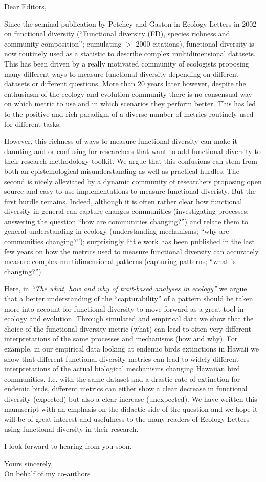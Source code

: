 \documentclass[11pt]{letter}
\begin{document}
\begin{letter}{}
\opening{Dear Editors,}

Since the seminal publication by Petchey and Gaston in Ecology Letters in 2002 on functional diversity (``Functional diversity (FD), species richness and community composition''; cumulating $>$ 2000 citations), functional diversity is now routinely used as a statistic to describe complex multidimensional datasets.
This has been driven by a really motivated community of ecologists proposing many different ways to measure functional diversity depending on different datasets or different questions.
More than 20 years later however, despite the enthusiasm of the ecology and evolution community there is no consensual way on which metric to use and in which scenarios they perform better.
This has led to the positive and rich paradigm of a diverse number of metrics routinely used for different tasks.

However, this richness of ways to measure functional diversity can make it daunting and or confusing for researchers that want to add functional diversity to their research methodology toolkit.
We argue that this confusions can stem from both an epistemological misunderstanding as well as practical hurdles.
The second is nicely alleviated by a dynamic community of researchers proposing open source and easy to use implementations to measure functional diveristy.
But the first hurdle remains.
Indeed, although it is often rather clear how functional diversity in general can capture changes communities (investigating processes; answering the question ``how are communities changing?'') and relate them to general understanding in ecology (understanding mechanisms; ``why are communities changing?''); surprisingly little work has been published in the last few years on how the metrics used to measure functional diversity can accurately measure complex multidimensional patterns (capturing patterns; ``what is changing?'').

Here, in \textit{``The what, how and why of trait-based analyses in ecology''} we argue that a better understanding of the ``capturability'' of a pattern should be taken more into account for functional diversity to move forward as a great tool in ecology and evolution.
Through simulated and empirical data we show that the choice of the functional diversity metric (what) can lead to often very different interpretations of the same processes and mechanisms (how and why).
For example, in our empirical data looking at endemic birds extinctions in Hawaii we show that different functional diversity metrics can lead to widely different interpretations of the actual biological mechanisms changing Hawaiian bird communities.
I.e. with the same dataset and a drastic rate of extinction for endemic birds, different metrics can either show a clear decrease in functional diversity (expected) but also a clear increase (unexpected).
We have written this manuscript with an emphasis on the didactic side of the question and we hope it will be of great interest and usefulness to the many readers of Ecology Letters using functional diversity in their research.

I look forward to hearing from you soon.

\closing{Yours sincerely,\\On behalf of my co-authors}

\end{letter}
\end{document}
